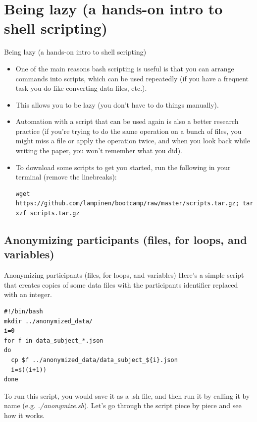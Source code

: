 \documentclass{beamer}
\begin{document}
\section{Being lazy (a hands-on intro to shell scripting)}
\begin{frame}[fragile]{Being lazy (a hands-on intro to shell scripting)}
\begin{itemize}
\item<1-> One of the main reasons bash scripting is useful is that you can arrange commands into scripts, which can be used repeatedly (if you have a frequent task you do like converting data files, etc.). 
\item<2-> This allows you to be lazy (you don't have to do things manually).
\item<3-> Automation with a script that can be used again is also a better research practice (if you're trying to do the same operation on a bunch of files, you might miss a file or apply the operation twice, and when you look back while writing the paper, you won't remember what you did).
\item<4-> To download some scripts to get you started, run the following in your terminal (remove the linebreaks):  
\begin{lstlisting}
wget https://github.com/lampinen/bootcamp/raw/master/scripts.tar.gz; tar xzf scripts.tar.gz
\end{lstlisting}
\end{itemize}
\end{frame}


\subsection{Anonymizing participants (files, for loops, and variables)}
\begin{frame}[fragile]{Anonymizing participants (files, for loops, and variables)}
Here's a simple script that creates copies of some data files with the participants identifier replaced with an integer. 
\begin{lstlisting}[title=anonymize.sh]
#!/bin/bash
mkdir ../anonymized_data/
i=0
for f in data_subject_*.json
do
  cp $f ../anonymized_data/data_subject_${i}.json
  i=$((i+1))
done
\end{lstlisting}
To run this script, you would save it as a .sh file, and then run it by calling it by name (e.g. \emph{./anonymize.sh}). Let's go through the script piece by piece and see how it works. 
\end{frame}
\end{document}
